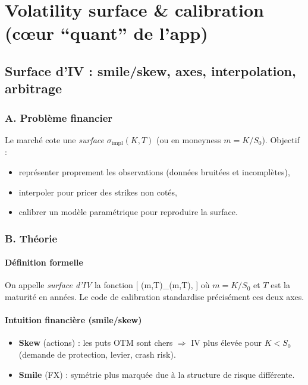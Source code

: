 \documentclass[11pt,a4paper]{report}
\theoremstyle{definition}
\theoremstyle{plain}
\theoremstyle{remark}
\newcommand{\1}{\mathbbm{1}}
\begin{document}
\part{Volatility surface & calibration (cœur “quant” de l'app)}

\chapter{Surface d'IV : smile/skew, axes, interpolation, arbitrage}

\section{A. Problème financier}
Le marché cote une \emph{surface} $\sigma_{\text{impl}}(K,T)$ (ou en moneyness $m=K/S_0$). Objectif :
\begin{itemize}[leftmargin=*]
\item représenter proprement les observations (données bruitées et incomplètes),
\item interpoler pour pricer des strikes non cotés,
\item calibrer un modèle paramétrique pour reproduire la surface.
\end{itemize}

\section{B. Théorie}
\subsection*{Définition formelle}
On appelle \emph{surface d'IV} la fonction
[
(m,T)\mapsto \sigma_{}(m,T),
]
où $m=K/S_0$ et $T$ est la maturité en années. Le code de calibration standardise précisément ces deux axes.

\subsection*{Intuition financière (smile/skew)}
\begin{itemize}[leftmargin=*]
\item \textbf{Skew} (actions) : les puts OTM sont chers $\Rightarrow$ IV plus élevée pour $K<S_0$ (demande de protection, levier, crash risk).
\item \textbf{Smile} (FX) : symétrie plus marquée due à la structure de risque différente.
\end{itemize}
\end{document}
